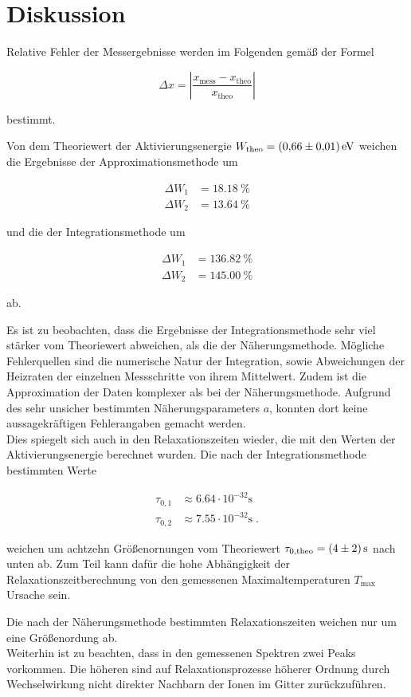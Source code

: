 \section{Diskussion}
\label{sec:Diskussion}

Relative Fehler der Messergebnisse werden im Folgenden gemäß der Formel

\begin{equation}
    \Delta x = \left| \frac{x_\text{mess} - x_\text{theo}}{x_\text{theo}}\right|
\end{equation}

bestimmt. 

Von dem Theoriewert der Aktivierungsenergie $W_\text{theo} = \SI{0.66 +- 0.01}{\eV}$ \cite{Buch}
weichen die Ergebnisse der Approximationsmethode um

\begin{align*}
    \Delta W_1 &= \SI{18.18}{\percent} \\
    \Delta W_2 &= \SI{13.64}{\percent}
\end{align*}

und die der Integrationsmethode um

\begin{align*}
    \Delta W_1 &= \SI{136.82}{\percent} \\
    \Delta W_2 &= \SI{145.00}{\percent} 
\end{align*}

ab.

Es ist zu beobachten, dass die Ergebnisse der Integrationsmethode sehr viel stärker vom Theoriewert abweichen, 
als die der Näherungsmethode. Mögliche Fehlerquellen sind die numerische Natur der Integration, sowie Abweichungen der
Heizraten der einzelnen Messschritte von ihrem Mittelwert. Zudem ist die Approximation der Daten komplexer als bei der
Näherungsmethode. Aufgrund des sehr unsicher bestimmten Näherungsparameters $a$, konnten dort keine aussagekräftigen Fehlerangaben
gemacht werden. \\

Dies spiegelt sich auch in den Relaxationszeiten wieder, die mit den Werten der Aktivierungsenergie berechnet wurden.
Die nach der Integrationsmethode bestimmten Werte

\begin{align*}
    \tau_{0,1} &\approx \num{6.64} \cdot 10^{-32} \si{\second}\\
    \tau_{0,2} &\approx \num{7.55} \cdot 10^{-32} \si{\second} \; .
\end{align*}

weichen um achtzehn Größenornungen vom Theoriewert
$\tau_{0,\text{theo}} = \SI{4 +- 2}{\second}$ \cite{Buch} nach unten ab. Zum Teil kann dafür die hohe Abhängigkeit der Relaxationszeitberechnung
von den gemessenen Maximaltemperaturen $T_\text{max}$ Ursache sein.

Die nach der Näherungsmethode bestimmten Relaxationszeiten weichen nur um eine Größenordung ab.\\

Weiterhin ist zu beachten, dass in den gemessenen Spektren zwei Peaks vorkommen. Die höheren sind auf Relaxationsprozesse
höherer Ordnung durch Wechselwirkung nicht direkter Nachbarn der Ionen im Gitter zurückzuführen. 


